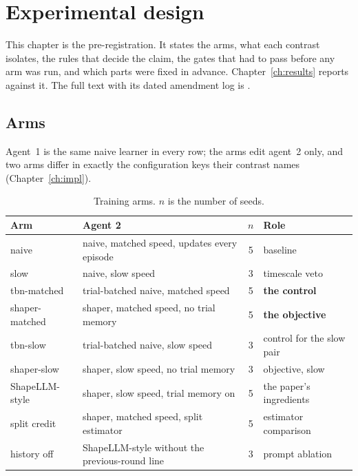 \chapter{Experimental design}
\label{ch:design}


This chapter is the pre-registration.
It states the arms, what each contrast isolates, the rules that decide the
claim, the gates that had to pass before any arm was run, and which parts
were fixed in advance.
Chapter~\ref{ch:results} reports against it.
The full text with its dated amendment log is
.

\section{Arms}
\label{sec:arms}

Agent~1 is the same naive learner in every row; the arms edit agent~2 only,
and two arms differ in exactly the configuration keys their contrast names
(Chapter~\ref{ch:impl}).

\begin{table}[ht]
\centering\small
\caption{Training arms. \(n\) is the number of seeds.}
\label{tab:arms}
\begin{tabularx}{\textwidth}{l>{\raggedright\arraybackslash}p{5.0cm}cX}
\toprule
Arm & Agent 2 & \(n\) & Role \\
\midrule
naive & naive, matched speed, updates every episode & 5 & baseline \\
slow & naive, slow speed & 3 & timescale veto \\
tbn-matched & trial-batched naive, matched speed & 5 & \textbf{the control} \\
shaper-matched & shaper, matched speed, no trial memory & 5 & \textbf{the objective} \\
tbn-slow & trial-batched naive, slow speed & 3 & control for the slow pair \\
shaper-slow & shaper, slow speed, no trial memory & 3 & objective, slow \\
ShapeLLM-style & shaper, slow speed, trial memory on & 5 & the paper's ingredients \\
split credit & shaper, matched speed, split estimator & 5 & estimator comparison \\
history off & ShapeLLM-style without the previous-round line & 3 & prompt ablation \\
\bottomrule
\end{tabularx}
\end{table}

